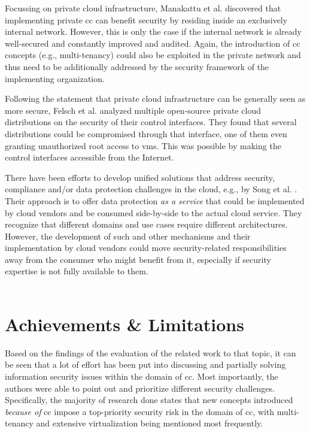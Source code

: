 Focussing on private cloud infrastructure, Manakattu et al. \cite{Manakattu2020} discovered that implementing private \ac{cc} can benefit security by residing inside an exclusively internal network. However, this is only the case if the internal network is already well-secured and constantly improved and audited. Again, the introduction of \ac{cc} concepts (e.g., multi-tenancy) could also be exploited in the private network and thus need to be additionally addressed by the security framework of the implementing organization.

Following the statement that private cloud infrastructure can be generally seen as more secure, Felsch et al. \cite{Felsch2015}  analyzed multiple open-source private cloud distributions on the security of their control interfaces. They found that several distributions could be compromised through that interface, one of them even granting unauthorized root access to \acp{vm}. This was possible by making the control interfaces accessible from the Internet.

There have been efforts to develop unified solutions that address security, compliance and/or data protection challenges in the cloud, e.g., by Song et al. \cite{Song2012}. Their approach is to offer data protection \textit{as a service} that could be implemented by cloud vendors and be consumed side-by-side to the actual cloud service. They recognize that different domains and use cases require different architectures. However, the development of such and other mechanisms and their implementation by cloud vendors could move security-related responsibilities away from the consumer who might benefit from it, especially if security expertise is not fully available to them. \\\

\section{Achievements \& Limitations} \label{sec:related-work_limitations}

Based on the findings of the evaluation of the related work to that topic, it can be seen that a lot of effort has been put into discussing and partially solving information security issues within the domain of \ac{cc}. Most importantly, the authors were able to point out and prioritize different security challenges. Specifically, the majority of research done  states that new concepts introduced \textit{because of} \ac{cc} impose a top-priority security risk in the domain of \ac{cc}, with multi-tenancy and extensive virtualization being mentioned most frequently. 

